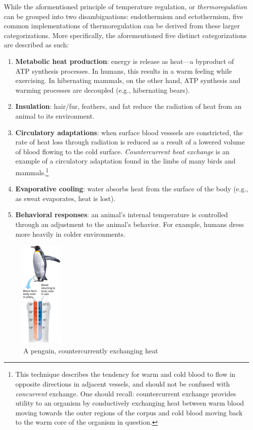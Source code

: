 \documentclass{article}
\begin{document}
While the aformentioned principle of temperature regulation, or
\emph{thermoregulation} can be grouped into two disambiguations: endothermism
and ectothermism, five common implementations of thermoregulation can be
derived from these larger categorizations. More specifically, the 
aforementioned five distinct categorizations are described as such:

\begin{enumerate}
	\item \textbf{Metabolic heat production}: energy is release as heat---a
		byproduct of ATP synthesis processes. In humans, this results in a warm
		feeling while exercising. In hibernating mammals, on the other hand,
		ATP synthesis and warming processes are decoupled (e.g., hibernating
		bears).
	\item \textbf{Insulation}: hair/fur, feathers, and fat reduce the
		radiation of heat from an animal to its environment.
	\item \textbf{Circulatory adaptations}: when surface blood vesssels are
		constricted, the rate of heat loss through radiation is reduced as a
		result of a lowered volume of blood flowing to the cold surface.
		\emph{Countercurrent heat exchange} is an example of a circulatory
		adaptation found in the limbs of many birds and mammals.\footnote{This
		technique describes the tendency for warm and cold blood to flow in
		opposite directions in adjacent vessels, and should not be confused with
		\emph{concurrent} exchange. One should recall: countercurrent exchange
		provides utility to an organism by conductively exchanging heat between
		warm blood moving towards the outer regions of the corpus and cold blood
		moving back to the warm core of the organism in question.}

	\item \textbf{Evaporative cooling}: water absorbs heat from the surface of
		the body (e.g., as sweat evaporates, heat is lost).
	\item \textbf{Behavioral responses}: an animal's internal temperature is
		controlled through an adjustment to the animal's behavior. For example,
		humans dress more heavily in colder environments.
\end{enumerate}

\begin{figure}[h]
	\centering
	\includegraphics[width=2cm]{penguin_example_ccexchange.png}
	\caption{A penguin, countercurrently exchanging heat}
\end{figure}
\end{document}
